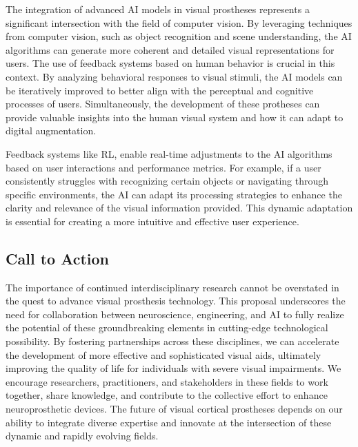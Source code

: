 \documentclass[10pt]{article}
\begin{document}
The integration of advanced AI models in visual prostheses represents a
significant intersection with the field of computer vision. By leveraging
techniques from computer vision, such as object recognition and scene
understanding, the AI algorithms can generate more coherent and detailed visual
representations for users. The use of feedback systems based on human behavior
is crucial in this context. By analyzing behavioral responses to visual stimuli,
the AI models can be iteratively improved to better align with the perceptual
and cognitive processes of users. Simultaneously, the development of these
protheses can provide valuable insights into the human visual system and how it
can adapt to digital augmentation.

Feedback systems like RL, enable real-time adjustments to the AI algorithms
based on user interactions and performance metrics. For example, if a user
consistently struggles with recognizing certain objects or navigating through
specific environments, the AI can adapt its processing strategies to enhance the
clarity and relevance of the visual information provided. This dynamic
adaptation is essential for creating a more intuitive and effective user
experience.

\subsection*{Call to Action}
The importance of continued interdisciplinary research cannot be overstated in
the quest to advance visual prosthesis technology. This proposal underscores the
need for collaboration between neuroscience, engineering, and AI to fully
realize the potential of these groundbreaking elements in cutting-edge
technological possibility. By fostering partnerships across these disciplines,
we can accelerate the development of more effective and sophisticated visual
aids, ultimately improving the quality of life for individuals with severe
visual impairments. We encourage researchers, practitioners, and stakeholders in
these fields to work together, share knowledge, and contribute to the collective
effort to enhance neuroprosthetic devices. The future of visual cortical
prostheses depends on our ability to integrate diverse expertise and innovate at
the intersection of these dynamic and rapidly evolving fields.
\clearpage
\end{document}
